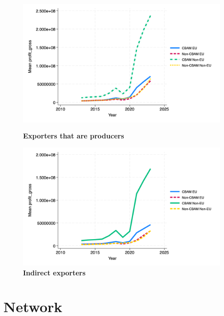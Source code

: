 \documentclass{article}
\begin{document}
\begin{figure}[H]
\centering
\includegraphics[width=0.95\textwidth]{profit_gross_ep.png}
\caption{\textbf{Exporters that are producers}}
\includegraphics[width=0.95\textwidth]{profit_gross_indir.png}
\caption{\textbf{Indirect exporters}}
\end{figure}

\section{Network}
\end{document}
